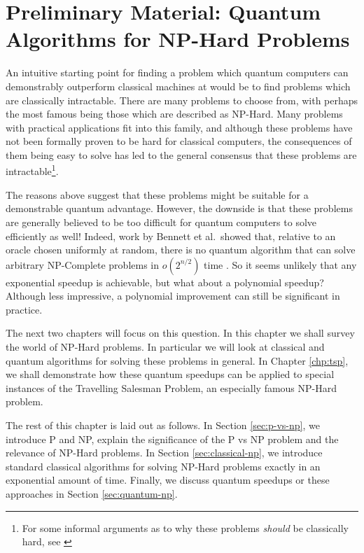 \chapter{Preliminary Material: Quantum Algorithms for NP-Hard Problems}
\label{chp:prelim-q-c}

An intuitive starting point for finding a problem which quantum computers can demonstrably outperform classical machines at would be to find problems which are classically intractable. There are many problems to choose from, with perhaps the most famous being those which are described as NP-Hard. Many problems with practical applications fit into this family, and although these problems have not been formally proven to be hard for classical computers, the consequences of them being easy to solve has led to the general consensus that these problems are intractable\footnote{For some informal arguments as to why these problems \textit{should} be classically hard, see \cite{aaronson2006}}.

The reasons above suggest that these problems might be suitable for a demonstrable quantum advantage. However, the downside is that these problems are generally believed to be too difficult for quantum computers to solve efficiently as well! Indeed, work by Bennett et al.\ showed that, relative to an oracle chosen uniformly at random, there is no quantum algorithm that can solve arbitrary NP-Complete problems in $o(2^{n/2})$ time \cite{bennett1997}. So it seems unlikely that any exponential speedup is achievable, but what about a polynomial speedup? Although less impressive, a polynomial improvement can still be significant in practice.

The next two chapters will focus on this question. In this chapter we shall survey the world of NP-Hard problems. In particular we will look at classical and quantum algorithms for solving these problems in general. In Chapter \ref{chp:tsp}, we shall demonstrate how these quantum speedups can be applied to special instances of the Travelling Salesman Problem, an especially famous NP-Hard problem.

The rest of this chapter is laid out as follows. In Section \ref{sec:p-vs-np}, we introduce P and NP, explain the significance of the P vs NP problem and the relevance of NP-Hard problems. In Section \ref{sec:classical-np}, we introduce standard classical algorithms for solving NP-Hard problems exactly in an exponential amount of time. Finally, we discuss quantum speedups or these approaches in Section \ref{sec:quantum-np}.

